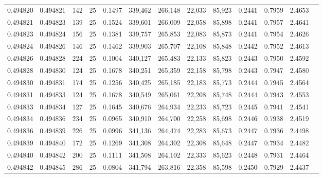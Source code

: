 \begin{tabular}{rrrrrrrrrrrrr}
0.494820 & 0.494821 &   142 &  25 &                                     0.1497 & 339,462 & 266,148 &  22,033 &  85,923 & 0.2441 & 0.7959 & 2.4653 \\
0.494821 & 0.494823 &   139 &  25 &                                     0.1524 & 339,601 & 266,009 &  22,058 &  85,898 & 0.2441 & 0.7957 & 2.4641 \\
0.494823 & 0.494824 &   156 &  25 &                                     0.1381 & 339,757 & 265,853 &  22,083 &  85,873 & 0.2441 & 0.7954 & 2.4626 \\
0.494824 & 0.494826 &   146 &  25 &                                     0.1462 & 339,903 & 265,707 &  22,108 &  85,848 & 0.2442 & 0.7952 & 2.4613 \\
0.494826 & 0.494828 &   224 &  25 &                                     0.1004 & 340,127 & 265,483 &  22,133 &  85,823 & 0.2443 & 0.7950 & 2.4592 \\
0.494828 & 0.494830 &   124 &  25 &                                     0.1678 & 340,251 & 265,359 &  22,158 &  85,798 & 0.2443 & 0.7947 & 2.4580 \\
0.494830 & 0.494831 &   174 &  25 &                                     0.1256 & 340,425 & 265,185 &  22,183 &  85,773 & 0.2444 & 0.7945 & 2.4564 \\
0.494831 & 0.494833 &   124 &  25 &                                     0.1678 & 340,549 & 265,061 &  22,208 &  85,748 & 0.2444 & 0.7943 & 2.4553 \\
0.494833 & 0.494834 &   127 &  25 &                                     0.1645 & 340,676 & 264,934 &  22,233 &  85,723 & 0.2445 & 0.7941 & 2.4541 \\
0.494834 & 0.494836 &   234 &  25 &                                     0.0965 & 340,910 & 264,700 &  22,258 &  85,698 & 0.2446 & 0.7938 & 2.4519 \\
0.494836 & 0.494839 &   226 &  25 &                                     0.0996 & 341,136 & 264,474 &  22,283 &  85,673 & 0.2447 & 0.7936 & 2.4498 \\
0.494839 & 0.494840 &   172 &  25 &                                     0.1269 & 341,308 & 264,302 &  22,308 &  85,648 & 0.2447 & 0.7934 & 2.4482 \\
0.494840 & 0.494842 &   200 &  25 &                                     0.1111 & 341,508 & 264,102 &  22,333 &  85,623 & 0.2448 & 0.7931 & 2.4464 \\
0.494842 & 0.494845 &   286 &  25 &                                     0.0804 & 341,794 & 263,816 &  22,358 &  85,598 & 0.2450 & 0.7929 & 2.4437 \\

\end{tabular}
